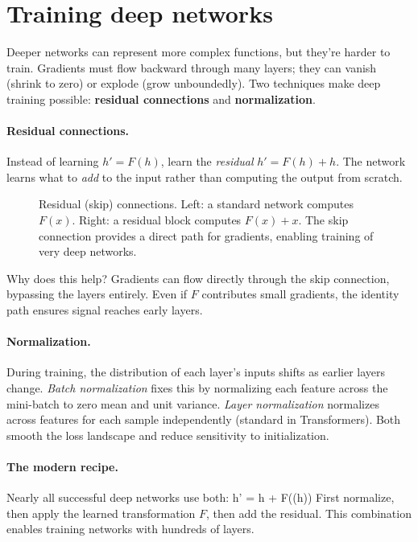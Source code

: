 \documentclass[11pt]{article}
\begin{document}
\section{Training deep networks}

Deeper networks can represent more complex functions, but they're harder to train. Gradients must flow backward through many layers; they can vanish (shrink to zero) or explode (grow unboundedly). Two techniques make deep training possible: \textbf{residual connections} and \textbf{normalization}.

\paragraph{Residual connections.} Instead of learning $h' = F(h)$, learn the \emph{residual} $h' = F(h) + h$. The network learns what to \emph{add} to the input rather than computing the output from scratch.

\begin{figure}[h]
\centering

\caption{Residual (skip) connections. Left: a standard network computes $F(x)$. Right: a residual block computes $F(x) + x$. The skip connection provides a direct path for gradients, enabling training of very deep networks.}
\label{fig:residual}
\end{figure}

Why does this help? Gradients can flow directly through the skip connection, bypassing the layers entirely. Even if $F$ contributes small gradients, the identity path ensures signal reaches early layers.

\paragraph{Normalization.} During training, the distribution of each layer's inputs shifts as earlier layers change. \emph{Batch normalization} fixes this by normalizing each feature across the mini-batch to zero mean and unit variance. \emph{Layer normalization} normalizes across features for each sample independently (standard in Transformers). Both smooth the loss landscape and reduce sensitivity to initialization.

\paragraph{The modern recipe.} Nearly all successful deep networks use both:
\beq
h' = h + F((h))
\eeq
First normalize, then apply the learned transformation $F$, then add the residual. This combination enables training networks with hundreds of layers.
\end{document}
